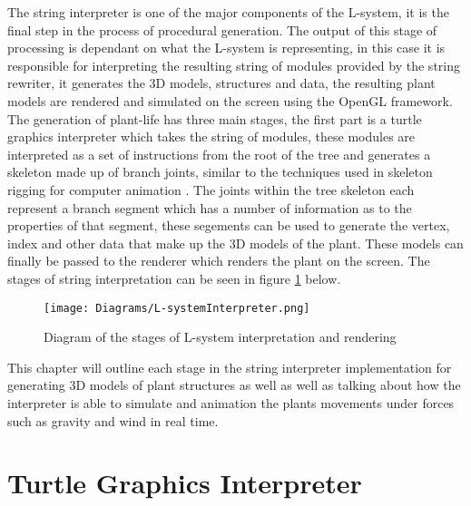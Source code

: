 
\lettrine[lines=3]{T}{}he string interpreter is one of the major components of the L-system, it is the final step in the process of procedural generation. The output of this stage of processing is dependant on what the L-system is representing, in this case it is responsible for interpreting the resulting string of modules provided by the string rewriter, it generates the 3D models, structures and data, the resulting plant models are rendered and simulated on the screen using the OpenGL framework. The generation of plant-life has three main stages, the first part is a turtle graphics interpreter which takes the string of modules, these modules are interpreted as a set of instructions from the root of the tree and generates a skeleton made up of branch joints, similar to the techniques used in skeleton rigging for computer animation \cite{gregory2014game}. The joints within the tree skeleton each represent a branch segment which has a number of information as to the properties of that segment, these segements can be used to generate the vertex, index and other data that make up the 3D models of the plant. These models can finally be passed to the renderer which renders the plant on the screen. The stages of string interpretation can be seen in figure \ref{l-system interpreter} below. 

\begin{figure}[htbp]
	{\centering
		\vspace{7px}
		\texttt{[image: Diagrams/L-systemInterpreter.png]}
		\caption{Diagram of the stages of L-system interpretation and rendering} \label{l-system interpreter}
	}
\end{figure}

This chapter will outline each stage in the string interpreter implementation for generating 3D models of plant structures as well as well as talking about how the interpreter is able to simulate and animation the plants movements under forces such as gravity and wind in real time. \\

\section{Turtle Graphics Interpreter}

